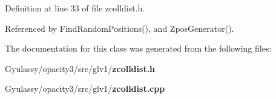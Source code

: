 Definition at line 33 of file zcolldist.h.

Referenced by FindRandomPositions(), and ZposGenerator().

The documentation for this class was generated from the following files:\begin{CompactItemize}
\item 
Gyulassy/opacity3/src/glv1/{\bf zcolldist.h}\item 
Gyulassy/opacity3/src/glv1/{\bf zcolldist.cpp}\end{CompactItemize}
